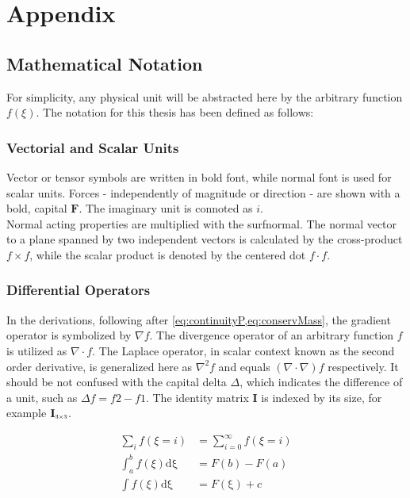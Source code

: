 \chapter{Appendix}

\section{Mathematical Notation}
For simplicity, any physical unit will be abstracted here by the arbitrary function $f(\xi)$.
The notation for this thesis has been defined as follows: 
\subsection{Vectorial and Scalar Units}
Vector or tensor symbols are written in bold font, while normal font is used for scalar units. Forces - independently of magnitude or direction - are shown with a bold, capital $\mathbf{F}$. The imaginary unit is connoted as $i$.\\ Normal acting properties are multiplied with the \acrfull{surfnormal}. The normal vector to a plane spanned by two independent vectors is calculated by the cross-product $f \times f$, while the scalar product is denoted by the centered dot $f \cdot f$.
\subsection{Differential Operators}
In the derivations, following after \cref{eq:continuityP,eq:conservMass}, the gradient operator is symbolized by $\nabla f$. The divergence operator of an arbitrary function $f$ is utilized as $\nabla\cdot f$. The Laplace operator, in scalar context known as the second order derivative, is generalized here as $\nabla^2 f$ and equals $(\nabla\cdot\nabla) f$ respectively. It should be not confused with the capital delta $\Delta$, which indicates the difference of a unit, such as $\Delta f = f{2} - f{1}$. The identity matrix $\mathbf{I}$ is indexed by its size, for example $\mathbf{I}_{\scaleto{3 \times 3}{4pt}}$. 

\begin{align}
	\sum_{i} f(\xi = i)&= \sum_{i = 0}^{\infty} f(\xi = i) \label{eq:app:sum}\\
	\int_{a}^{b} f(\xi) \mathrm{d\xi} &= F(b) - F(a) \label{eq:app:intDef}\\
	\int f(\xi) \mathrm{d\xi}&= F(\mathrm{\xi}) + c \label{eq:app:intIndef}
\end{align}

